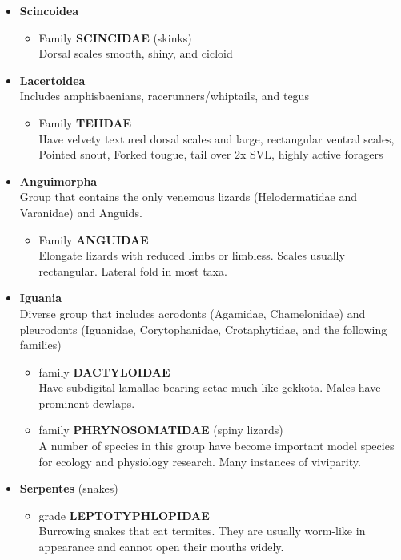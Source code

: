 \documentclass[a4paper,12pt]{article}
\begin{document}
\begin{description}
\begin{itemize}
\begin{itemize}
  \end{itemize}
  \item{\textbf{Scincoidea}}
  \begin{itemize}
    \item Family {\textbf{SCINCIDAE} (skinks)} \\ Dorsal scales smooth, shiny, and cicloid
  \end{itemize}
  \item{\textbf{Lacertoidea}} \\ Includes amphisbaenians, racerunners/whiptails, and tegus
  \begin{itemize}
    \item Family {\textbf{TEIIDAE}} \\ Have velvety textured dorsal scales and large, rectangular ventral scales, Pointed snout, Forked tougue, tail over 2x SVL, highly active foragers
  \end{itemize}
    \item{\textbf{Anguimorpha}} \\ Group that contains the only venemous lizards (Helodermatidae and Varanidae) and Anguids.
  \begin{itemize}
    \item Family {\textbf{ANGUIDAE}} \\ Elongate lizards with reduced limbs or limbless. Scales usually rectangular. Lateral fold in most taxa.
  \end{itemize}
  \item{\textbf{Iguania}} \\ Diverse group that includes acrodonts (Agamidae, Chamelonidae) and pleurodonts (Iguanidae, Corytophanidae, Crotaphytidae, and the following families)
  \begin{itemize}
    \item family {\textbf{DACTYLOIDAE}} \\ Have subdigital lamallae bearing setae much like gekkota. Males have prominent dewlaps.
    \item family {\textbf{PHRYNOSOMATIDAE}} (spiny lizards) \\ A number of species in this group have become important model species for ecology and physiology research. Many instances of viviparity.
  \end{itemize}
  \item{\textbf{Serpentes} (snakes)}
  \begin{itemize}
    \item grade {\textbf{LEPTOTYPHLOPIDAE}} \\ Burrowing snakes that eat termites. They are usually worm-like in appearance and cannot open their mouths widely.

\end{itemize}
\end{itemize}
\end{description}
\end{document}
